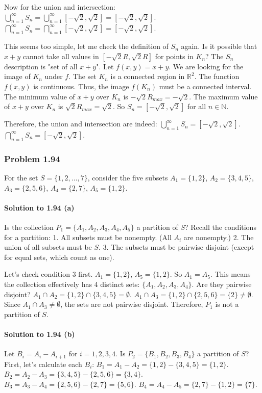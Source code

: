 \documentclass{article}
\begin{document}
\begin{itemize}
\begin{itemize}
\begin{itemize}
Now for the union and intersection:
$\bigcup_{n=1}^\infty S_n = \bigcup_{n=1}^\infty [-\sqrt{2}, \sqrt{2}] = [-\sqrt{2}, \sqrt{2}]$.
$\bigcap_{n=1}^\infty S_n = \bigcap_{n=1}^\infty [-\sqrt{2}, \sqrt{2}] = [-\sqrt{2}, \sqrt{2}]$.

This seems too simple, let me check the definition of $S_n$ again.
Is it possible that $x+y$ cannot take all values in $[-\sqrt{2}R, \sqrt{2}R]$ for points in $K_n$?
The $S_n$ description is "set of all $x+y$".
Let $f(x,y) = x+y$. We are looking for the image of $K_n$ under $f$.
The set $K_n$ is a connected region in $\mathbb{R}^2$. The function $f(x,y)$ is continuous.
Thus, the image $f(K_n)$ must be a connected interval.
The minimum value of $x+y$ over $K_n$ is $-\sqrt{2}R_{max} = -\sqrt{2}$.
The maximum value of $x+y$ over $K_n$ is $\sqrt{2}R_{max} = \sqrt{2}$.
So $S_n = [-\sqrt{2}, \sqrt{2}]$ for all $n \in \mathbb{N}$.

Therefore, the union and intersection are indeed:
$\bigcup_{n=1}^\infty S_n = [-\sqrt{2}, \sqrt{2}]$.
$\bigcap_{n=1}^\infty S_n = [-\sqrt{2}, \sqrt{2}]$.

\subsubsection*{Problem 1.94}
For the set $S = \{1, 2, \dots, 7\}$, consider the five subsets
$A_1 = \{1, 2\}$, $A_2 = \{3, 4, 5\}$, $A_3 = \{2, 5, 6\}$, $A_4 = \{2, 7\}$, $A_5 = \{1, 2\}$.

\paragraph*{Solution to 1.94 (a)}
Is the collection $P_1 = \{A_1, A_2, A_3, A_4, A_5\}$ a partition of $S$?
Recall the conditions for a partition:
1.  All subsets must be nonempty. (All $A_i$ are nonempty.)
2.  The union of all subsets must be $S$.
3.  The subsets must be pairwise disjoint (except for equal sets, which count as one).

Let's check condition 3 first.
$A_1 = \{1, 2\}$, $A_5 = \{1, 2\}$. So $A_1 = A_5$. This means the collection effectively has 4 distinct sets: $\{A_1, A_2, A_3, A_4\}$.
Are they pairwise disjoint?
$A_1 \cap A_2 = \{1, 2\} \cap \{3, 4, 5\} = \emptyset$.
$A_1 \cap A_3 = \{1, 2\} \cap \{2, 5, 6\} = \{2\} \neq \emptyset$.
Since $A_1 \cap A_3 \neq \emptyset$, the sets are not pairwise disjoint.
Therefore, $P_1$ is not a partition of $S$.

\paragraph*{Solution to 1.94 (b)}
Let $B_i = A_i - A_{i+1}$ for $i = 1, 2, 3, 4$. Is $P_2 = \{B_1, B_2, B_3, B_4\}$ a partition of $S$?
First, let's calculate each $B_i$:
$B_1 = A_1 - A_2 = \{1, 2\} - \{3, 4, 5\} = \{1, 2\}$.
$B_2 = A_2 - A_3 = \{3, 4, 5\} - \{2, 5, 6\} = \{3, 4\}$.
$B_3 = A_3 - A_4 = \{2, 5, 6\} - \{2, 7\} = \{5, 6\}$.
$B_4 = A_4 - A_5 = \{2, 7\} - \{1, 2\} = \{7\}$.


\end{itemize}
\end{itemize}
\end{itemize}
\end{document}
